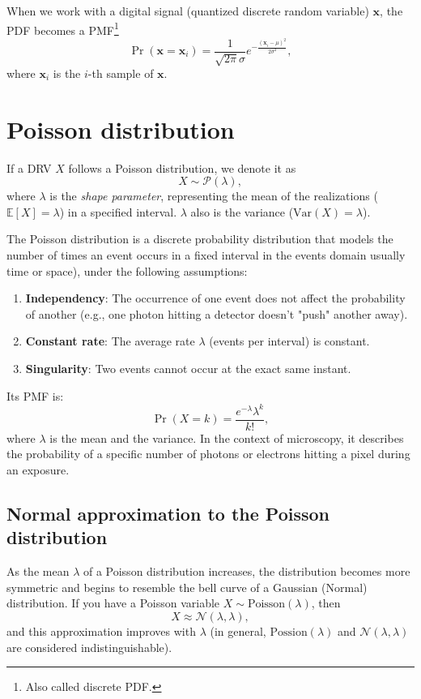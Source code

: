 When we work with a digital signal (quantized discrete random
variable) $\mathbf{x}$, the \gls{PDF} becomes a
\gls{PMF}\footnote{Also called discrete \gls{PDF}.}
\begin{equation}
  \Pr(\mathbf{x}{=}\mathbf{x}_i) = \frac{1}{\sqrt{2\pi}\sigma} e^{-\frac{(\mathbf{x}_i-\mu)^2}{2\sigma^2} },
  \label{eq:normal_PMD}
\end{equation}
where $\mathbf{x}_i$ is the $i$-th sample of $\mathbf{x}$.


\section{Poisson distribution}
\label{sec:poisson_distribution}

If a \gls{DRV} $X$ follows a Poisson distribution,
we denote it as
\begin{equation}
  X\sim\mathcal{P}(\lambda),
\end{equation}
where $\lambda$ is the \emph{shape parameter}, representing the mean
of the realizations ($\mathbb{E}[X]=\lambda$) in a specified
interval. $\lambda$ also is the variance ($\text{Var}(X)=\lambda$).

The Poisson distribution is a discrete probability distribution that
models the number of times an event occurs in a fixed
interval in the events domain usually time or space),
under the following assumptions:
\begin{enumerate}
\item \textbf{Independency}: The occurrence of one event does not
  affect the probability of another (e.g., one photon hitting a
  detector doesn't "push" another away).
\item \textbf{Constant rate}: The average rate $\lambda$ (events per
  interval) is constant.
\item \textbf{Singularity}: Two events cannot occur at the exact same
  instant.
\end{enumerate}

Its \gls{PMF} is:
\begin{equation}
  \Pr(X{=}k) = \frac{e^{-\lambda}\lambda^{k}}{k!},
  \label{eq:PD}
\end{equation}
where $\lambda$ is the mean and the variance. In the context of
microscopy, it describes the probability of a specific number of
photons or electrons hitting a pixel during an exposure.

\subsection{Normal approximation to the Poisson distribution}
As the mean $\lambda$ of a Poisson distribution increases, the
distribution becomes more symmetric and begins to resemble the bell
curve of a Gaussian (Normal) distribution. If you have a Poisson
variable $X\sim\text{Poisson}(\lambda)$, then
\begin{equation}
  X\approx\mathcal{N}(\lambda,\lambda),
  \label{eq:poisson_to_normal}
\end{equation}
and this approximation improves with $\lambda$ (in general,
$\text{Possion}(\lambda)$ and $\mathcal{N}(\lambda,\lambda)$ are
considered indistinguishable).

